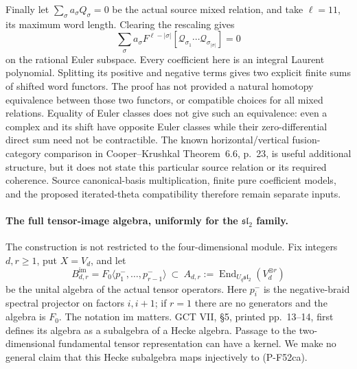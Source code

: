 Finally let $\sum_\sigma a_\sigma Q_\sigma=0$ be the actual
source mixed relation, and take $\ell=11$, its maximum word
length.  Clearing the rescaling gives
\[
 \sum_\sigma a_\sigma F^{\ell-|\sigma|}
          [\mathscr Q_{\sigma_1}\cdots
             \mathscr Q_{\sigma_{|\sigma|}}]=0
                                                               \tag{P-F52bz}
\]
on the rational Euler subspace.  Every coefficient here is
an integral Laurent polynomial.  Splitting its positive and
negative terms gives two explicit finite sums of shifted
word functors.  The proof has not provided a natural homotopy
equivalence between those two functors, or compatible choices
for all mixed relations.  Equality of Euler classes does not
give such an equivalence: even a complex and its shift have
opposite Euler classes while their zero-differential direct
sum need not be contractible.  The known horizontal/vertical
fusion-category comparison in Cooper--Krushkal Theorem~6.6,
p.~23, is useful additional structure, but it does not state
this particular source relation or its required coherence.
Source canonical-basis multiplication, finite pure coefficient
models, and the proposed iterated-theta compatibility therefore
remain separate inputs.

\paragraph{The full tensor-image algebra, uniformly for the $\mathfrak{sl}_2$ family.}
The construction is not restricted to the four-dimensional module.
Fix integers $d,r\ge1$, put $X=V_d$, and let
\[
 B^{\mathrm{im}}_{d,r}
   =F_0\langle p^-_1,\ldots,p^-_{r-1}\rangle
      \ \subset\ A_{d,r}
      :=\operatorname{End}_{U_q\mathfrak{sl}_2}(V_d^{\otimes r})
                                                               \tag{P-F52ca}
\]
be the unital algebra of the actual tensor operators.
Here $p^-_i$ is the negative-braid spectral projector on
factors $i,i+1$; if $r=1$ there are no generators and the
algebra is $F_0$.
The notation $\mathrm{im}$ matters.  GCT VII, \S5,
printed pp.~13--14, first defines its algebra as a subalgebra
of a Hecke algebra.  Passage to the two-dimensional fundamental
tensor representation can have a kernel.  We make no general
claim that this Hecke subalgebra maps injectively to
(P-F52ca).

